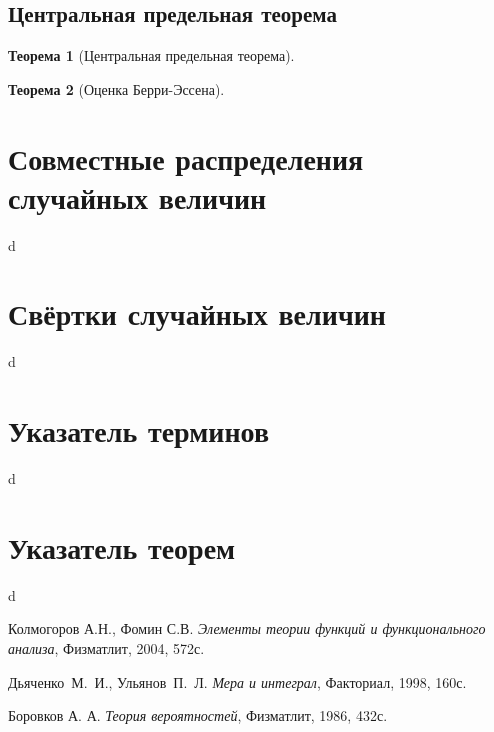 \documentclass[12pt]{article}
\newtheorem{theorem}{Теорема}
\numberwithin{theorem}{section}
\numberwithin{proposition}{section}
\theoremstyle{definition}
\begin{document}
	\subsection{Центральная предельная теорема}
	
	\begin{theorem}[Центральная предельная теорема]
		
	\end{theorem}
	
	\begin{theorem}[Оценка Берри-Эссена]
		
	\end{theorem}
	
	\section{Совместные распределения случайных величин}
	
	d
	
	\section{Свёртки случайных величин}
	
	d
	
	\section{Указатель терминов}
	
	d
	
	\section{Указатель теорем}
	
	d
	
	\begin{thebibliography}{2}
		
		 Колмогоров А.Н., Фомин С.В. {\it Элементы теории функций и функционального анализа}, Физматлит, 2004, 572с.
		
		 Дьяченко~М.~И., Ульянов~П.~Л. {\it Мера и интеграл}, Факториал, 1998, 160с.
	
		 Боровков А. А. {\it Теория вероятностей}, Физматлит, 1986, 432с.
	
	\end{thebibliography}
	
	
\end{document}
